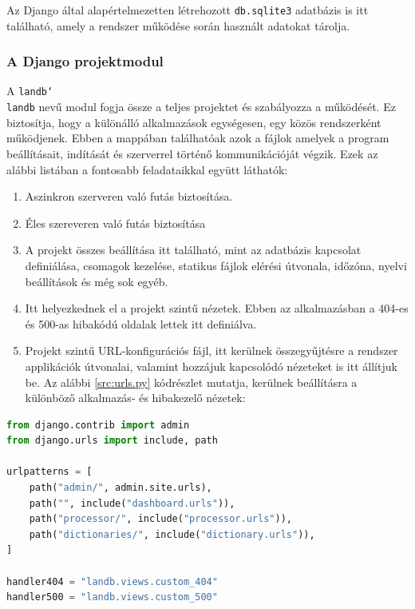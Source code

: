 Az Django által alapértelmezetten létrehozott \texttt{db.sqlite3} adatbázis is itt található, amely a rendszer működése során használt adatokat tárolja.

\pagebreak

\subsubsection{A Django projektmodul}

A \texttt{landb\char`\\landb} nevű modul fogja össze a teljes projektet és szabályozza a működését. Ez biztosítja, hogy a különálló alkalmazások egységesen, egy közös rendszerként működjenek. Ebben a mappában találhatóak azok a fájlok amelyek a program beállításait, indítását és szerverrel történő kommunikációját végzik. Ezek az alábbi listában a fontosabb feladataikkal együtt láthatók:

\begin{enumerate}
  \item[\texttt{asgi.py}] Aszinkron szerveren való futás biztosítása.
  \item[\texttt{wsgi.py}] Éles szereveren való futás biztosítása
  \item[\texttt{settings.py}] A projekt  összes beállítása itt található, mint az adatbázis kapcsolat definiálása, csomagok kezelése, statikus fájlok elérési útvonala, időzóna, nyelvi beállítások és még sok egyéb.
  \item[\texttt{views.py}] Itt helyezkednek el a projekt szintű nézetek. Ebben az alkalmazásban a 404-es és 500-as hibakódú oldalak lettek itt definiálva.
  \item[\texttt{urls.py}] Projekt szintű URL-konfigurációs fájl, itt kerülnek összegyűjtésre a rendszer applikációk útvonalai, valamint hozzájuk kapcsolódó nézeteket is itt állítjuk be. Az alábbi \ref{src:urls.py} kódrészlet mutatja, kerülnek beállításra a különböző alkalmazás- és hibakezelő nézetek:
\end{enumerate}

\begin{lstlisting}[language={Python}]
from django.contrib import admin
from django.urls import include, path

urlpatterns = [
    path("admin/", admin.site.urls),
    path("", include("dashboard.urls")),
    path("processor/", include("processor.urls")),
    path("dictionaries/", include("dictionary.urls")),
]

handler404 = "landb.views.custom_404"
handler500 = "landb.views.custom_500"
\end{lstlisting}

